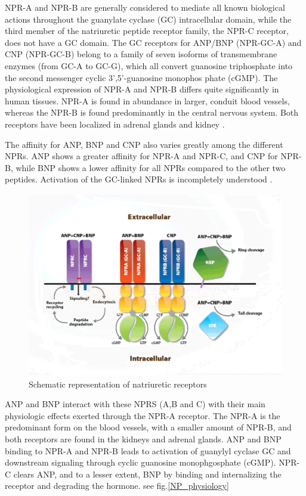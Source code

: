 \documentclass[14pt,a4paper,onecolumn]{extarticle}
\begin{document}
NPR-A and NPR-B are generally considered to mediate all known biological actions throughout the guanylate cyclase (GC) intracellular domain, while the third member of the natriuretic peptide receptor family, the NPR-C receptor, does not have a GC domain.  The GC receptors for ANP/BNP (NPR-GC-A) and CNP (NPR-GC-B) belong to a family of seven isoforms of transmembrane enzymes (from GC-A to GC-G), which all convert guanosine triphosphate into the second messenger cyclic 3’,5’-guanosine monophos phate (cGMP).  The physiological expression of NPR-A and NPR-B differs quite significantly in human tissues. NPR-A is found in abundance in larger, conduit blood vessels, whereas the NPR-B is found predominantly in the central nervous system. Both receptors have been localized in adrenal glands and kidney \citep{168}.

The affinity for ANP, BNP and CNP also varies greatly among the different NPRs.  ANP shows a greater affinity for NPR-A and NPR-C, and CNP for NPR-B, while BNP shows a lower affinity for all NPRs compared to the other two peptides.  Activation of the GC-linked NPRs is incompletely understood \citep{172}.

\begin{figure}      \centering      \includegraphics[scale=1]{../../images/NP_receptors.jpg}     \small\caption{Schematic representation of natriuretic receptors}      \label{NP_receptors}  \end{figure}

ANP and BNP interact with these NPRS (A,B and C)  with their main physiologic effects exerted through the NPR-A receptor.  The NPR-A is the predominant form on the blood vessels, with a smaller amount of NPR-B, and both receptors are found in the kidneys and adrenal glands.  ANP and BNP binding to NPR-A and NPR-B leads to activation of guanylyl cyclase GC and downstream signaling through cyclic guanosine monophgosphate (cGMP).  NPR-C clears ANP, and to a lesser extent, BNP by binding and internalizing the receptor and degrading the hormone. see fig.\ref{NP_physiology} \citep{Maisel2018}
\end{document}
